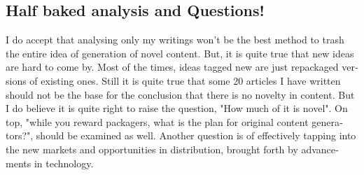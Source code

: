 \begin{english}
\section{Half baked analysis and Questions!}

I do accept that analysing only my writings won't be the best method to trash the entire idea of generation of novel content. But, it is quite true that new ideas are hard to come by. Most of the times, ideas tagged new are just repackaged versions of existing ones. Still it is quite true that some 20 articles I have written should not be the base for the conclusion that there is no novelty in content. But I do believe it is quite right to raise the question, "How much of it is novel". On top, "while you reward packagers, what is the plan for original content generators?", should be examined as well. Another question is of effectively tapping into the new markets and opportunities in distribution, brought forth by advancements in technology.
\end{english}
\newpage
